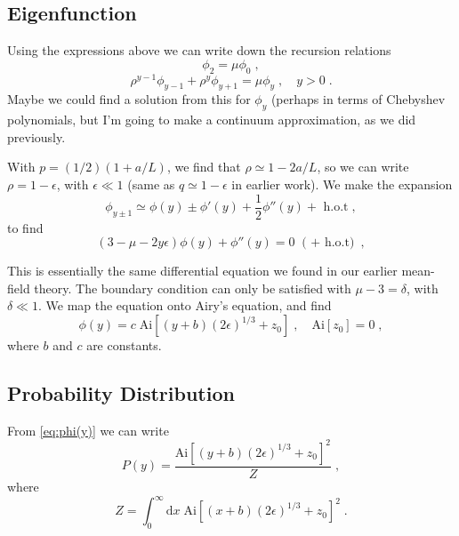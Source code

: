 \documentclass[a4paper,10pt]{article}
\newcommand{\Ai}{\mathrm{Ai}}
\begin{document}
\subsection{Eigenfunction}

Using the expressions above we can write down the recursion relations
\begin{equation}\label{eq:recursion_bc}
 \phi_2 = \mu \phi_0 \;,
\end{equation}
\begin{equation}\label{eq:recursion}
 \rho^{y-1} \phi_{y-1} + \rho^{y} \phi_{y+1} = \mu \phi_y \;, \quad y > 0 \; .
\end{equation}
Maybe we could find a solution from this for $\phi_y$ (perhaps in terms of Chebyshev polynomials, but I'm going to make a continuum approximation, as we did previously.

With $p = (1/2)(1 + a/L)$, we find that $\rho \simeq 1 - 2a/L$, so we can write $\rho = 1 - \epsilon$, with $\epsilon \ll 1$ (same as $q \simeq 1- \epsilon$ in earlier work). We make the expansion
\begin{equation}
 \phi_{y\pm1} \simeq \phi(y) \pm \phi'(y) + \frac{1}{2} \phi''(y) + \mbox{ h.o.t}\;,
\end{equation}
to find
\begin{equation}
 (3 - \mu - 2y\epsilon)\phi(y) + \phi''(y) = 0  \mbox{ ( $+$ h.o.t)}\;,
\end{equation}

This is essentially the same differential equation we found in our earlier mean-field theory. The boundary condition can only be satisfied with $\mu - 3 = \delta$, with $\delta \ll 1$. We map the equation onto Airy's equation, and find
\begin{equation}\label{eq:phi(y)}
 \phi(y) = c \; \Ai[ (y + b)(2\epsilon)^{1/3} + z_0] \;, \quad \Ai[z_0] = 0 \;,
\end{equation}
where $b$ and $c$ are constants.

\subsection{Probability Distribution}

From \eqref{eq:phi(y)} we can write
\begin{equation}
 P(y) = \frac{\Ai[ (y + b)(2\epsilon)^{1/3} + z_0] ^2}{Z} \;, 
\end{equation}
where
\begin{equation}
 Z = \int_0^\infty \mathrm{d}x \; \Ai[(x + b)(2\epsilon)^{1/3} + z_0] ^2 \;.
\end{equation}
\end{document}
